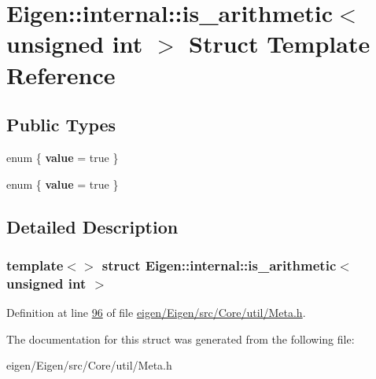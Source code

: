 \hypertarget{struct_eigen_1_1internal_1_1is__arithmetic_3_01unsigned_01int_01_4}{}\section{Eigen\+:\+:internal\+:\+:is\+\_\+arithmetic$<$ unsigned int $>$ Struct Template Reference}
\label{struct_eigen_1_1internal_1_1is__arithmetic_3_01unsigned_01int_01_4}
\subsection*{Public Types}
\begin{DoxyCompactItemize}
\item 
\mbox{\label{struct_eigen_1_1internal_1_1is__arithmetic_3_01unsigned_01int_01_4_ae00cb12f3d37df0ef02a9aefa7d7539d}} 
enum \{ {\bfseries value} = true
 \}
\item 
\mbox{\label{struct_eigen_1_1internal_1_1is__arithmetic_3_01unsigned_01int_01_4_a940b2d15ee209cdf9b628eda56796fe8}} 
enum \{ {\bfseries value} = true
 \}
\end{DoxyCompactItemize}


\subsection{Detailed Description}
\subsubsection*{template$<$$>$\newline
struct Eigen\+::internal\+::is\+\_\+arithmetic$<$ unsigned int $>$}



Definition at line \hyperlink{eigen_2_eigen_2src_2_core_2util_2_meta_8h_source_l00096}{96} of file \hyperlink{eigen_2_eigen_2src_2_core_2util_2_meta_8h_source}{eigen/\+Eigen/src/\+Core/util/\+Meta.\+h}.



The documentation for this struct was generated from the following file\+:\begin{DoxyCompactItemize}
\item 
eigen/\+Eigen/src/\+Core/util/\+Meta.\+h\end{DoxyCompactItemize}
